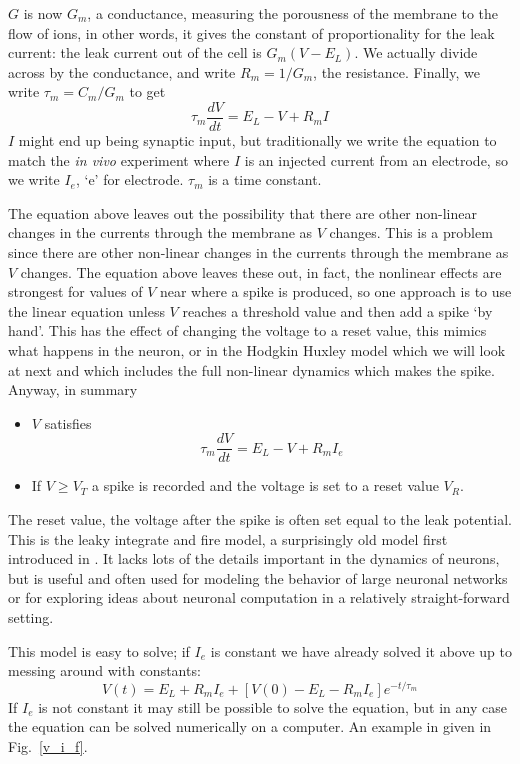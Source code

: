 \documentclass[11pt,a4paper]{scrartcl}
\begin{document}
$G$ is now $G_m$, a conductance, measuring the porousness of the
membrane to the flow of ions, in other words, it gives the constant of proportionality for the leak current: the leak current out of the cell is
$G_m(V-E_L)$. We actually divide across by the conductance, and write
$R_m=1/G_m$, the resistance. Finally, we write $\tau_m=C_m/G_m$ to get
\begin{equation}
\tau_m\frac{dV}{dt}=E_L-V+R_mI
\end{equation}
$I$ might end up being synaptic input, but traditionally we write the
equation to match the \textsl{in vivo} experiment where $I$ is an
injected current from an electrode, so we write $I_e$, \lq{}e\rq{} for
electrode. $\tau_m$ is a time constant.

The equation above leaves out the possibility that there are other
non-linear changes in the currents through the membrane as $V$
changes. This is a problem since there are other non-linear changes in
the currents through the membrane as $V$ changes. The equation above
leaves these out, in fact, the nonlinear effects are strongest for
values of $V$ near where a spike is produced, so one approach is to
use the linear equation unless $V$ reaches a threshold value and then
add a spike \lq{}by hand\rq{}. This has the effect of changing the
voltage to a reset value, this mimics what happens in the neuron, or
in the Hodgkin Huxley model which we will look at next and which
includes the full non-linear dynamics which makes the spike. Anyway,
in summary
\begin{itemize}
\item $V$ satisfies
\begin{equation}
\tau_m\frac{dV}{dt}=E_L-V+R_mI_e
\end{equation}
\item If $V\ge V_T$ a spike is recorded and the voltage is set to a
  reset value $V_R$.
\end{itemize}
The reset value, the voltage after the spike is often set equal to the
leak potential. This is the leaky integrate and fire model, a
surprisingly old model first introduced in \cite{Lapicque1907a}. It
lacks lots of the details important in the dynamics of neurons, but is
useful and often used for modeling the behavior of large neuronal
networks or for exploring ideas about neuronal computation in a
relatively straight-forward setting.

This model is easy to solve; if $I_e$ is constant we have already
solved it above up to messing around with constants:
\begin{equation}
V(t)=E_L+R_mI_e+[V(0)-E_L-R_mI_e]e^{-t/\tau_m}
\end{equation}
If $I_e$ is not constant it may still be possible to solve the
equation, but in any case the equation can be solved numerically on a
computer. An example in given in Fig.~\ref{v_i_f}.
\end{document}

